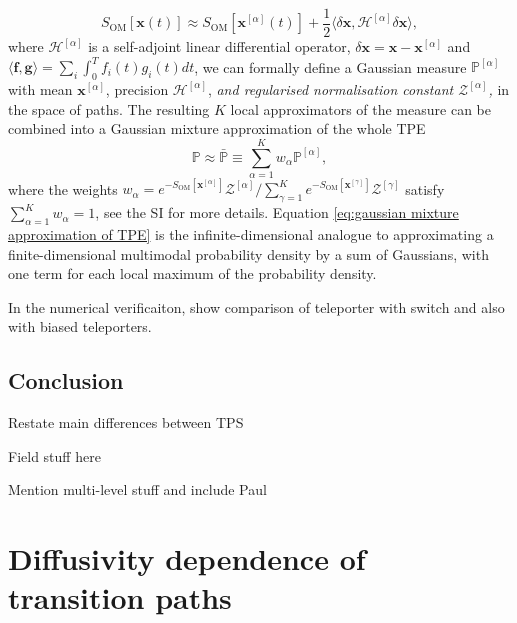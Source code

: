 {\begin{equation}
S_{\text{OM}}[\mathbf{x}(t)]\approx S_{\text{OM}}[\mathbf{x}^{[\alpha]}(t)]+\frac{1}{2}\langle\delta\mathbf{x},\mathcal{H}^{[\alpha]}\delta\mathbf{x\rangle},\label{eq:quadratic expansion}
\end{equation}
where $\mathcal{H}^{[\alpha]}$ is a self-adjoint linear differential
operator, $\delta\mathbf{\mathbf{x}}=\mathbf{x}-\mathbf{x}^{[\alpha]}$
and $\langle\mathbf{f},\mathbf{g}\rangle=\sum_{i}\int_{0}^{T}f_{i}(t)g_{i}(t)dt$,
we can formally define a Gaussian measure $\mathbb{P}^{[\alpha]}$
with mean $\mathbf{x}^{[\alpha]}$, precision $\mathcal{H}^{[\alpha]}$,
\textit{\emph{and regularised normalisation constant $\mathcal{Z}^{[\alpha]}$,
}}in the space of paths. The resulting $K$ local approximators of
the measure can be combined into a Gaussian mixture approximation
\textit{\emph{\citep{gelmanBayesianDataAnalysis}}} of the whole TPE
\begin{equation}
\mathbb{P}\approx\bar{\mathbb{P}}\equiv\sum_{\alpha=1}^{K}w_{\alpha}\mathbb{P}^{[\alpha]},\label{eq:gaussian mixture approximation of TPE}
\end{equation}
where the weights $w_{\alpha}=e^{-S_{\text{OM}}[\mathbf{x}^{[\alpha]}]}\mathcal{Z}^{[\alpha]}/\sum_{\gamma=1}^{K}e^{-S_{\text{OM}}[\mathbf{x}^{[\gamma]}]}\mathcal{Z}^{[\gamma]}$
satisfy $\sum_{\alpha=1}^{K}w_{\alpha}=1$, see the SI \citep{note:SI}
for more details. Equation \eqref{eq:gaussian mixture approximation of TPE}
is the infinite-dimensional analogue to approximating a finite-dimensional
multimodal probability density by a sum of Gaussians, with one term
for each local maximum of the probability density.

}


{
\color{blue}

In the numerical verificaiton, show comparison of teleporter with switch and also with biased teleporters.
}



\section{Conclusion}

Restate main differences between TPS

Field stuff here

Mention multi-level stuff and include Paul

\chapter{Diffusivity dependence of transition paths} \label{ch:Diffusivity dependence of transition paths}

